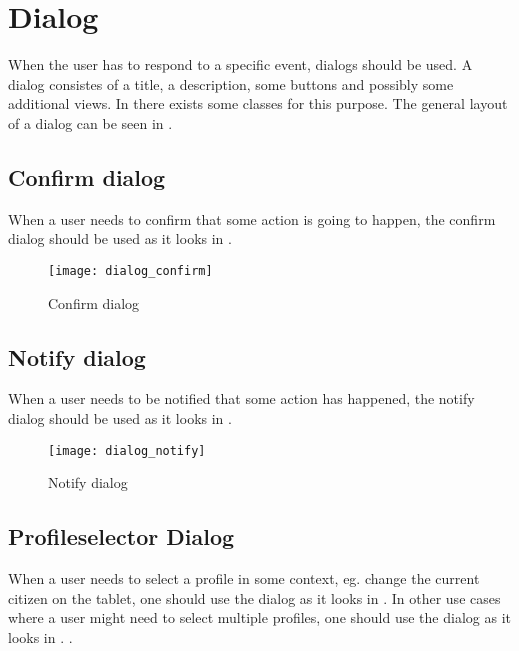 
\chapter{Dialog}
\label{cha:dialog}


When the user has to respond to a specific event, dialogs should be used. A dialog consistes of a title, a description, some buttons and possibly some additional views. In \gc there exists some classes for this purpose. The general layout of a dialog can be seen in .

\section{Confirm dialog}
\label{sec:confirm_dialog}

When a user needs to confirm that some action is going to happen, the confirm dialog should be used as it looks in . 

\begin{figure}[h]
	\centering
	\texttt{[image: dialog\_confirm]}
	\caption{Confirm dialog}
	\label{fig:confirm_dialog}
\end{figure}
\FloatBarrier

\section{Notify dialog}
\label{sec:notify_dialog}

When a user needs to be notified that some action has happened, the notify dialog should be used as it looks in . 

\begin{figure}[h]
	\centering
	\texttt{[image: dialog\_notify]}
	\caption{Notify dialog}
	\label{fig:notify_dialog}
\end{figure}
\FloatBarrier

\section{Profileselector Dialog}
\label{sec:profileselector_dialog}

When a user needs to select a profile in some context, eg. change the current citizen on the tablet, one should use the dialog as it looks in . In other use cases where a user might need to select multiple profiles, one should use the dialog as it looks in . .

